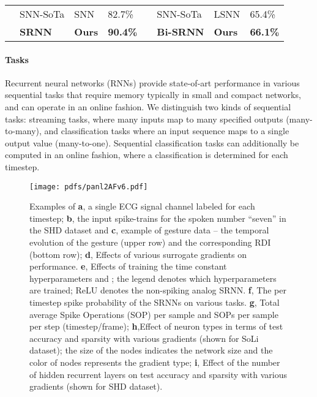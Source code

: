 \documentclass[fleqn,10pt]{wlscirep}
\begin{document}
\begin{table}[]
\begin{tabular}{|l|l|l|l|l|l|l|l|}
                         &SNN-SoTa                               & SNN\cite{perez2021neural} & 82.7\%                                       &                        & SNN-SoTa                                                      & LSNN\cite{bellec2018long}                & 65.4\%                                                       \\ \cline{2-4} \cline{6-8} 
                         & \cellcolor{green}\bf SRNN & \cellcolor{green}\bf Ours          & \cellcolor{green}\bf 90.4\%  &                        & \cellcolor{green}\bf Bi-SRNN & \cellcolor{green}\bf Ours & \cellcolor{green}\bf 66.1\% \\ \hline
\end{tabular}
\label{tab:sota_acc}
\end{table}




\paragraph{Tasks} Recurrent neural networks (RNNs) provide state-of-art performance in various sequential tasks that require memory \cite{shewalkar2019performance} typically in small and compact networks, and can operate in an online fashion. We distinguish two kinds of sequential tasks: streaming tasks, where many inputs map to many specified outputs (many-to-many), and classification tasks where an input sequence maps to a single output value (many-to-one). Sequential classification tasks can additionally be computed in an online fashion, where a classification is determined for each timestep.








\begin{figure}[ht!]
\centering

\texttt{[image: pdfs/panl2AFv6.pdf]}
\caption{Examples of \textbf{a}, a single ECG signal channel labeled for each timestep; \textbf{b}, the input spike-trains for the spoken number ``seven'' in the SHD dataset and \textbf{c}, example of gesture data -- the temporal evolution of the gesture (upper row) and the corresponding RDI (bottom row); \textbf{d}, Effects of various surrogate gradients on performance. \textbf{e}, Effects of training the time constant hyperparameters  and ; the legend denotes which hyperparameters are trained; ReLU denotes the non-spiking analog SRNN. \textbf{f}, The per timestep spike probability of the SRNNs on various tasks.  \textbf{g}, Total average Spike Operations (SOP) per sample and SOPs per sample per step (timestep/frame); \textbf{h},Effect of neuron types in terms of test accuracy and sparsity with various gradients (shown for SoLi dataset); the size of the nodes indicates the network size and the color of nodes represents the gradient type; \textbf{i}, Effect of the number of hidden recurrent layers on test accuracy and sparsity with various gradients (shown for SHD dataset).}
\label{fig:panel-2}
\end{figure}
\end{document}
